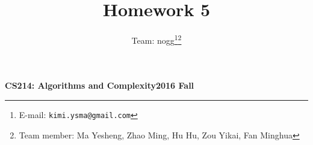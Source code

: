 \documentclass[12pt, notitlepage]{article}
\title{Homework 5}
\author{Team: nogg\footnote{E-mail: \texttt{kimi.ysma@gmail.com}}\footnote{Team member: Ma Yesheng, Zhao Ming, Hu Hu, Zou Yikai, Fan Minghua}}
\begin{document}
{\bf\small CS214: Algorithms and Complexity}\hfill{\bf\small 2016 Fall}
{\let\newpage\relax\maketitle}
\end{document}
